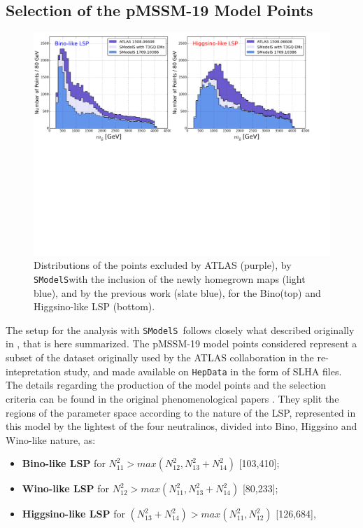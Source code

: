 \documentclass[preprint,number,sort&compress,twocolumn,3p]{elsstyarticle}
\newcommand{\SMO}{\texttt{SModelS\xspace}}
\begin{document}
\subsection{Selection of the pMSSM-19 Model Points}
\begin{figure}
	\begin{center}
		\includegraphics[width=1\textwidth]{PLOTS/New/New_Res.pdf}	
	\end{center}
	\caption{Distributions of the points excluded by ATLAS (purple), by \SMO with the inclusion of the newly homegrown maps (light blue), and by the previous work \cite{Ambrogi:2017lov} (slate blue), for the Bino(top) and Higgsino-like LSP (bottom).}
	\label{pmssm_new_exclusion_gluino}
\end{figure}
The setup for the analysis with \SMO~follows closely what described originally in \cite{Ambrogi:2017lov}, that is here summarized. The pMSSM-19 model points considered represent a subset of the dataset originally used by the ATLAS collaboration in the re-intepretation study\cite{Aad:2015baa}, and made available on \texttt{HepData}\cite{ATLASpMSSMhepdata} in the form of SLHA\cite{Skands:2003cj} files. The details regarding the production of the model points and the selection criteria can be found in the original phenomenological papers \cite{Berger:2008cq,CahillRowley:2012cb,CahillRowley:2012kx,Cahill-Rowley:2014twa}.
They split the regions of the parameter space according to the nature of the LSP, represented in this model by the lightest of the four neutralinos, divided into Bino, Higgsino and Wino-like nature, as:
\begin{itemize}
	\item \textbf{Bino-like LSP} for $N_{11}^2 > max(N^2_{12},N^2_{13} + N^2_{14})$ [103,410]; \
	\item \textbf{Wino-like LSP} for $N_{12}^2 > max(N^2_{11},N^2_{13} + N^2_{14})$ [80,233]; \
	\item \textbf{Higgsino-like LSP} for $(N_{13}^2 + N_{14}^2 )  > max(N^2_{11},N^2_{12})$ [126,684],\
\end{itemize}
\end{document}
